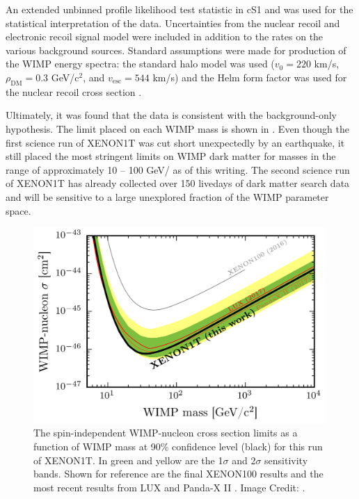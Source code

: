 An extended unbinned profile likelihood test statistic in cS1 and \csbottom{} was used for the statistical interpretation of the data.  Uncertainties from the nuclear recoil and electronic recoil signal model were included in addition to the rates on the various background sources.  Standard assumptions were made for production of the WIMP energy spectra: the standard halo model was used ($v_0 = 220$ km/s, $\rho_{\textrm{DM}} = 0.3$ GeV/$\textrm{c}^2$, and $v_{\textrm{esc}} = 544$ km/s) and the Helm form factor was used for the nuclear recoil cross section \cite{engel1991nuclear, lewin1996review}.

Ultimately, it was found that the data is consistent with the background-only hypothesis.  The limit placed on each WIMP mass is shown in .  Even though the first science run of XENON1T was cut short unexpectedly by an earthquake, it still placed the most stringent limits on WIMP dark matter for masses in the range of approximately 10 -- 100 GeV/\csquared{} as of this writing.  The second science run of XENON1T has already collected over 150 livedays of dark matter search data and will be sensitive to a large unexplored fraction of the WIMP parameter space.

\begin{figure}[p]
	\centering
	\includegraphics[width=0.99\textwidth]{xe1t_sr0_limit}
	\caption{ The spin-independent WIMP-nucleon cross section limits as a function of WIMP mass at 90\% confidence level (black) for this run of XENON1T. In green and yellow are the 1$\sigma$ and 2$\sigma$ sensitivity bands.  Shown for reference are the final XENON100 results \cite{aprile2016xenon100} and the most recent results from LUX \cite{akerib2017results} and Panda-X II \cite{collaboration2017dark}.  Image Credit: .}
	\label{fig:xe1t_sr0_limit}
\end{figure}






